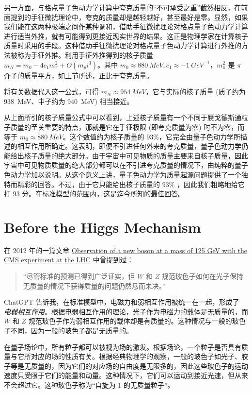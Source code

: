\documentclass[oneside,a4paper,openany,11pt]{ctexbook}
\begin{document}
另一方面，与格点量子色动力学计算中夸克质量的“不可承受之重”截然相反，在前面提到的手征微扰理论中，夸克的质量却是越轻越好，甚至最好是零。显然，如果我们能在这两种极端之间作某种调和，借助手征微扰理论对格点量子色动力学计算进行适当外推，就有可能得到更接近现实世界的结果。这正是物理学家在计算核子质量时采用的手段。这种借助手征微扰理论对格点量子色动力学计算进行外推的方法被称为手征外推。利用手征外推得到的核子质量 $m_N=m_0-4 c_1 m_\pi^2 + O(m_pi^3)$。其中 $m_0 \approx \qty{880}{MeV}, c_1 \approx-\qty{1}{GeV^{-1}}$，$m^2_\pi$ 是 $\pi$ 介子的质量平方，如上节所述，正比于夸克质量。

将有关数据代入这一公式，可得 $m_N\approx\qty{954}{MeV}$，它与实际的核子质量 (质子约为 \qty{938}{MeV}、中子约为 \qty{940}{MeV}) 相当接近。

从上面所引的核子质量公式中可以看到，上述核子质量有一个不同于赝戈德斯通粒子质量的至关重要的特点，那就是它在手征极限 (即夸克质量为零) 时不为零，而等于 $m_0 \approx\qty{880}{MeV}$。这个数值约为核子质量的 $93\%$，它完全由量子色动力学所描述的相互作用所确定。这表明，即便不引进任何外来的夸克质量，量子色动力学仍能给出核子质量的绝大部分。由于宇宙中可见物质的质量主要来自核子质量，因此宇宙中可见物质质量的绝大部分都可以在不引进夸克质量的情况下，由纯粹的量子色动力学加以说明。从这个意义上讲，量子色动力学为质量起源问题提供了一个独特而精彩的回答。不过，由于它只能给出核子质量的 $93\%$ ，因此我们粗略地给它打 $93$ 分。在标准模型的范围内，这是迄今所知的最佳回答。

\chapter{Before the Higgs Mechanism}

在 2012 年的一篇文章 \href{https://inspirehep.net/literature/1124338}{Observation of a new boson at a mass of 125 GeV with the CMS experiment at the LHC} 中曾提到过：

\begin{quote}
    “尽管标准的预测已得到广泛证实，但 $W$ 和 $Z$ 规范玻色子如何在光子保持无质量的情况下获得质量的问题仍然悬而未决。”
\end{quote}

ChatGPT 告诉我，在标准模型中，电磁力和弱相互作用被统一在一起，形成了 \emph{电弱相互作用}。根据电弱相互作用的理论，光子作为电磁力的载体是无质量的，而 $W$ 和 $Z$ 规范玻色子作为弱相互作用的载体却是有质量的。这种情况与一般的玻色子不同，因为一般的玻色子都是无质量的。

在量子场论中，所有粒子都可以被视为场的激发。根据场论，一个粒子是否具有质量与它所对应的场的性质有关。根据经典物理学的观察，一般的玻色子如光子、胶子等是无质量的，因为它们的对应场的自由度是无限多的，因此这些玻色子的运动速度只受限于它们的能量和动量。这种情况下，它们可以运动到接近光速，但从来不会超过它。这种玻色子称为“自旋为 $1$ 的无质量粒子”。
\end{document}
